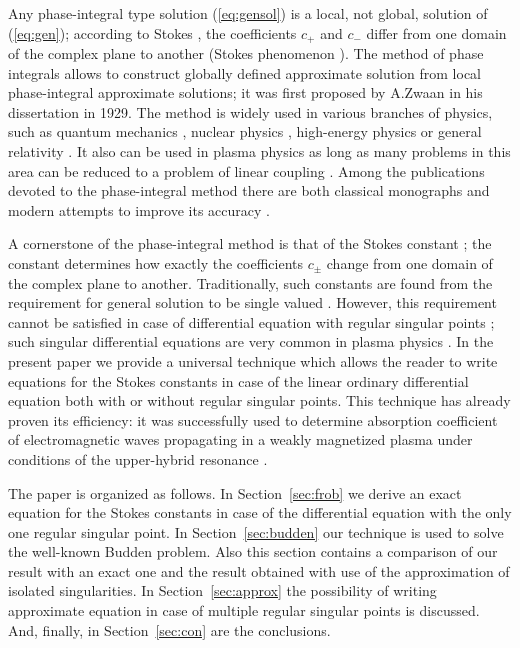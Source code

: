 \documentclass[asy]{iosart2x}
\newcommand\eref[1]{(\ref{#1})}
\newcommand\sref[1]{Section~\ref{#1}}
\begin{document}
Any phase-integral type solution \eref{eq:gensol} is a local, not global, 
solution of \eref{eq:gen}; according to Stokes \cite{stokes}, the coefficients $c_+$ and $c_-$
differ from one domain of the complex plane to another (Stokes phenomenon \cite{frbook,stokes,heading,rwbook}). 
The method of phase integrals allows to construct globally 
defined approximate solution from local phase-integral approximate solutions; 
it was first proposed by A.Zwaan \cite{zwaan} in his dissertation in 1929. 
The method is widely used in various branches of physics, such as 
quantum mechanics \cite{serg96,serg02,esp09},  
nuclear physics \cite{aleixo00}, high-energy physics \cite{poor16} or general relativity \cite{ander92,manor77,rojas07}.
It also can be used in plasma physics as long as many problems 
in this area can be reduced to a problem of linear coupling \cite{shal08,shal10,shal12}.
Among the publications devoted to the phase-integral method there are both 
classical monographs \cite{frbook,heading,rwbook,dingle73,berry91} 
and modern attempts to improve its accuracy \cite{ours,delabaere97}.

A cornerstone of the phase-integral method is that of the Stokes constant \cite{heading,rwbook}; 
the constant determines how exactly the coefficients $c_\pm$ change from one domain of the complex plane to another. 
Traditionally, such constants are found from the requirement for general solution to be single 
valued \cite{frpaper}. However, this requirement 
cannot be satisfied in case of differential equation with regular singular points \cite{cbbook}; such singular 
differential equations are very common in plasma physics \cite{gosp17}. In the present paper we provide a universal 
technique which allows the reader to write equations for the Stokes constants in case of the linear ordinary 
differential equation both with or without regular singular points. 
This technique has already proven its efficiency: it was successfully used to 
determine absorption coefficient of electromagnetic waves propagating in a weakly magnetized plasma 
under conditions of the upper-hybrid resonance \cite{kut17}.

The paper is organized as follows.
In \sref{sec:frob} we derive an exact equation for the Stokes constants in case of the differential
equation with the only one regular singular point. 
In \sref{sec:budden} our technique is used to solve the well-known Budden problem. Also this
section contains a comparison of our result with an exact one and the result obtained with use
of the approximation of isolated singularities.
In \sref{sec:approx} the possibility of writing approximate equation in case of multiple 
regular singular points is discussed.
And, finally, in \sref{sec:con} are the conclusions. 
\end{document}
